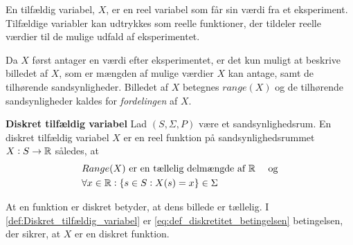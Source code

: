 



En tilfældig variabel, $X$, er en reel variabel som får sin værdi fra et eksperiment. 
Tilfældige variabler kan udtrykkes som reelle funktioner, der tildeler reelle værdier til de mulige udfald af eksperimentet.

Da $X$ først antager en værdi efter eksperimentet, er det kun muligt at beskrive billedet af $X$, som er mængden af mulige værdier $X$ kan antage, samt de  tilhørende sandsynligheder. Billedet af $X$ betegnes $range(X)$ og de tilhørende sandsynligheder kaldes for \textit{fordelingen} af $X$.


\begin{minipage}\textwidth
\begin{defn}\label{def:Diskret_tilfældig_variabel}\textbf{Diskret tilfældig variabel} %
\newline
Lad $(S, \Sigma, P)$ være et sandsynlighedsrum. En diskret tilfældig variabel $X$ er en reel funktion på sandsynlighedsrummet $X:S\to \mathbb{R}$ således, at
%
\begin{align}
    &\text{$Range(X)$ er en tællelig delmængde af $\R$ } \quad \text{og}\label{eq:def_diskretitet_betingelsen}\\
    &\forall x\in \R: \{s\in S: X(s)=x\}\in %
    \Sigma\label{eq:def_tilfældig_variabel}
\end{align}

\end{defn}
\end{minipage}


At en funktion er diskret betyder, at dens billede er tællelig. 
I \autoref{def:Diskret_tilfældig_variabel} er
\eqref{eq:def_diskretitet_betingelsen} betingelsen, der sikrer, at $X$ er en diskret funktion.



